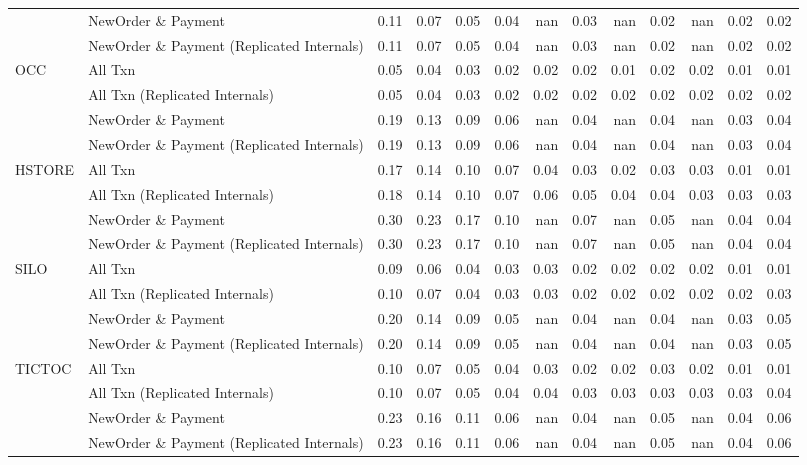 \begin{tabular}{llrrrrrrrrrrr}
       & NewOrder \& Payment &  0.11 &  0.07 &  0.05 &  0.04 &   nan &  0.03 &   nan &  0.02 &   nan &  0.02 &  0.02 \\
       & NewOrder \& Payment (Replicated Internals) &  0.11 &  0.07 &  0.05 &  0.04 &   nan &  0.03 &   nan &  0.02 &   nan &  0.02 &  0.02 \\
OCC & All Txn &  0.05 &  0.04 &  0.03 &  0.02 &  0.02 &  0.02 &  0.01 &  0.02 &  0.02 &  0.01 &  0.01 \\
       & All Txn (Replicated Internals) &  0.05 &  0.04 &  0.03 &  0.02 &  0.02 &  0.02 &  0.02 &  0.02 &  0.02 &  0.02 &  0.02 \\
       & NewOrder \& Payment &  0.19 &  0.13 &  0.09 &  0.06 &   nan &  0.04 &   nan &  0.04 &   nan &  0.03 &  0.04 \\
       & NewOrder \& Payment (Replicated Internals) &  0.19 &  0.13 &  0.09 &  0.06 &   nan &  0.04 &   nan &  0.04 &   nan &  0.03 &  0.04 \\
HSTORE & All Txn &  0.17 &  0.14 &  0.10 &  0.07 &  0.04 &  0.03 &  0.02 &  0.03 &  0.03 &  0.01 &  0.01 \\
       & All Txn (Replicated Internals) &  0.18 &  0.14 &  0.10 &  0.07 &  0.06 &  0.05 &  0.04 &  0.04 &  0.03 &  0.03 &  0.03 \\
       & NewOrder \& Payment &  0.30 &  0.23 &  0.17 &  0.10 &   nan &  0.07 &   nan &  0.05 &   nan &  0.04 &  0.04 \\
       & NewOrder \& Payment (Replicated Internals) &  0.30 &  0.23 &  0.17 &  0.10 &   nan &  0.07 &   nan &  0.05 &   nan &  0.04 &  0.04 \\
SILO & All Txn &  0.09 &  0.06 &  0.04 &  0.03 &  0.03 &  0.02 &  0.02 &  0.02 &  0.02 &  0.01 &  0.01 \\
       & All Txn (Replicated Internals) &  0.10 &  0.07 &  0.04 &  0.03 &  0.03 &  0.02 &  0.02 &  0.02 &  0.02 &  0.02 &  0.03 \\
       & NewOrder \& Payment &  0.20 &  0.14 &  0.09 &  0.05 &   nan &  0.04 &   nan &  0.04 &   nan &  0.03 &  0.05 \\
       & NewOrder \& Payment (Replicated Internals) &  0.20 &  0.14 &  0.09 &  0.05 &   nan &  0.04 &   nan &  0.04 &   nan &  0.03 &  0.05 \\
TICTOC & All Txn &  0.10 &  0.07 &  0.05 &  0.04 &  0.03 &  0.02 &  0.02 &  0.03 &  0.02 &  0.01 &  0.01 \\
       & All Txn (Replicated Internals) &  0.10 &  0.07 &  0.05 &  0.04 &  0.04 &  0.03 &  0.03 &  0.03 &  0.03 &  0.03 &  0.04 \\
       & NewOrder \& Payment &  0.23 &  0.16 &  0.11 &  0.06 &   nan &  0.04 &   nan &  0.05 &   nan &  0.04 &  0.06 \\
       & NewOrder \& Payment (Replicated Internals) &  0.23 &  0.16 &  0.11 &  0.06 &   nan &  0.04 &   nan &  0.05 &   nan &  0.04 &  0.06 \\
\bottomrule
\end{tabular}
